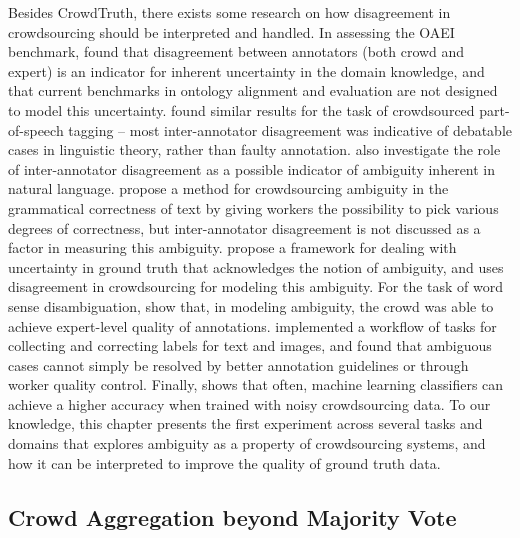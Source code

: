 Besides CrowdTruth, there exists some research on how disagreement in crowdsourcing should be interpreted and handled. In assessing the OAEI benchmark, \cite{cheatham2014conference} found that disagreement between annotators (both crowd and expert) is an indicator for inherent uncertainty in the domain knowledge, and that current benchmarks in ontology alignment and evaluation are not designed to model this uncertainty. \cite{plank-hovy-sogaard:2014:P14-2} found similar results for the task of crowdsourced part-of-speech tagging -- most inter-annotator disagreement was indicative of debatable cases in linguistic theory, rather than faulty annotation. \cite{Bayerl2011} also investigate the role of inter-annotator disagreement as a possible indicator of ambiguity inherent in natural language. \cite{lau2014measuring} propose a method for crowdsourcing ambiguity in the grammatical correctness of text by giving workers the possibility to pick various degrees of correctness, but inter-annotator disagreement is not discussed as a factor in measuring this ambiguity. \cite{schaekermann2016} propose a framework for dealing with uncertainty in ground truth that acknowledges the notion of ambiguity, and uses disagreement in crowdsourcing for modeling this ambiguity. For the task of word sense disambiguation, \cite{jurgens2013embracing} show that, in modeling ambiguity, the crowd was able to achieve expert-level quality of annotations. \cite{Chang:2017:Revolt} implemented a workflow of tasks for collecting and correcting labels for text and images, and found that ambiguous cases cannot simply be resolved by better annotation guidelines or through worker quality control. Finally, \cite{lin2014re} shows that often, machine learning classifiers can achieve a higher accuracy when trained with noisy crowdsourcing data. To our knowledge, this chapter presents the first experiment across several tasks and domains that explores ambiguity as a property of crowdsourcing systems, and how it can be interpreted to improve the quality of ground truth data.


\subsection{Crowd Aggregation beyond Majority Vote}

